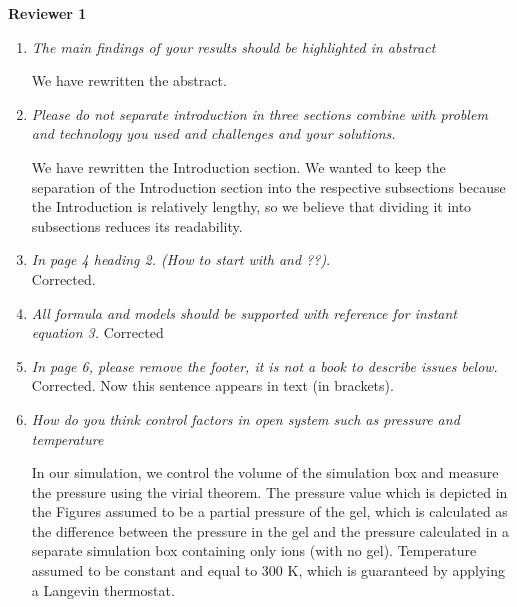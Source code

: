 \documentclass[12pt]{dinbrief}
\begin{document}
\textbf{Reviewer 1}
\textit{}

\begin{enumerate}
\item \textit{The main findings of your results should be highlighted in abstract} 

We have rewritten the abstract. 

\item \textit{Please do not separate introduction in three sections combine with problem and technology you used and challenges and your solutions.}

We have rewritten the Introduction section.
We wanted to keep the separation of the Introduction section into the respective subsections because the Introduction is relatively lengthy, so we believe that dividing it into subsections reduces its readability.

\item \textit{In page 4 heading 2. (How to start with and ??)}.\\
Corrected.

\item \textit{All formula and models should be supported with reference for instant equation 3.}
Corrected

\item \textit{In page 6, please remove the footer, it is not a book to describe issues below}.\\
Corrected. Now this sentence appears in text (in brackets).

\item \textit{How do you think control factors in open system such as pressure and temperature}

In our simulation, we control the volume of the simulation box and measure the pressure using the virial theorem. The pressure value which is depicted in the Figures assumed to be a partial pressure of the gel, which is calculated as the difference between the pressure in the gel and the pressure calculated in a separate simulation box containing only ions (with no gel).
Temperature assumed to be constant and equal to 300 K, which is guaranteed by applying a Langevin thermostat.

\end{enumerate}
\end{document}
